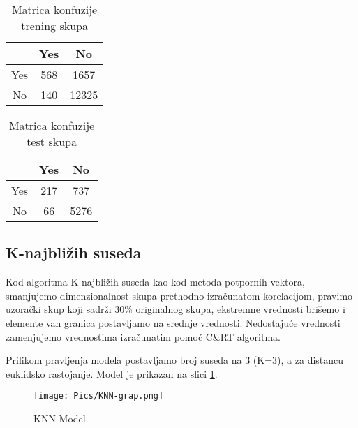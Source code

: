 \documentclass[a4paper]{article}
\begin{document}
        \begin{table}[H]
        \begin{center}
        \caption{Matrica konfuzije trening skupa}
        \label{tab:SVM-trening-CM}
        \begin{tabular}{|c|c|c|} \hline
        \textbf{} & \textbf{Yes} & \textbf{No} \\ \hline
        Yes & 568 & 1657  \\ \hline
        No & 140 & 12325 \\ \hline
        \end{tabular}
        \end{center}
        \end{table}
        
        \begin{table}[H]
        \begin{center}
        \caption{Matrica konfuzije test skupa}
        \label{tab:SVM-test-CM}
        \begin{tabular}{|c|c|c|} \hline
        \textbf{} & \textbf{Yes} & \textbf{No} \\ \hline
        Yes & 217 &  737  \\ \hline
        No & 66 & 5276 \\ \hline
        \end{tabular}
        \end{center}
        \end{table}
        



\subsection{K-najbližih suseda}
\label{KNN}
Kod algoritma K najbližih suseda kao kod metoda potpornih vektora, smanjujemo dimenzionalnost skupa prethodno izračunatom korelacijom, pravimo uzorački skup koji sadrži 30\% originalnog skupa, ekstremne vrednosti brišemo i elemente van granica postavljamo na srednje vrednosti. Nedostajuće vrednosti zamenjujemo vrednostima izračunatim pomoć C\&RT algoritma.\par
Prilikom pravljenja modela postavljamo broj suseda na 3 (K=3), a za distancu euklidsko rastojanje. Model je prikazan na slici \ref{fig:knn-graph}.

\begin{figure}[H]
     \centering
     \texttt{[image: Pics/KNN-grap.png]}
     \caption{KNN Model}
     \label{fig:knn-graph}
\end{figure}
\end{document}
